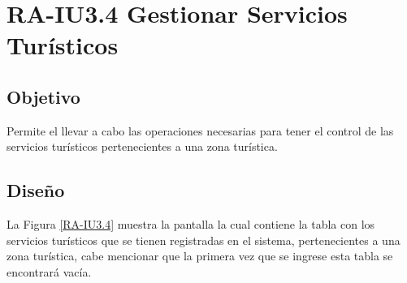 \newpage
\section{RA-IU3.4 Gestionar Servicios Turísticos}

\subsection{Objetivo}
Permite el llevar a cabo las operaciones necesarias para tener el control de las servicios turísticos pertenecientes a una zona turística.

\subsection{Diseño}
La Figura \ref{RA-IU3.4} muestra la pantalla  la cual contiene la tabla con los servicios turísticos que se tienen registradas en el sistema, pertenecientes a una zona turística, cabe mencionar que la primera vez que se ingrese esta tabla se encontrará vacía. 

